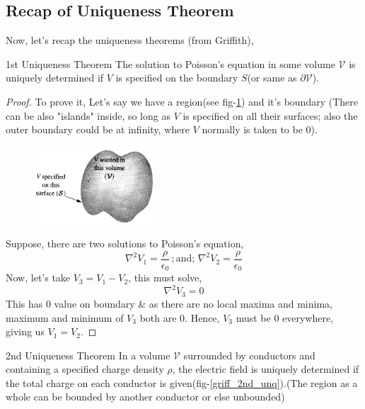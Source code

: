 \documentclass{article}
\begin{document}
\subsection{Recap of Uniqueness Theorem}
Now, let's recap the uniqueness theorems (from Griffith),
\begin{theorem}{1st Uniqueness Theorem}{}
    The solution to Poisson's equation in some volume $\mathcal{V}$ is uniquely determined if $V$ is specified on the boundary $S$(or same as $\partial \mathcal{V}$). 
\end{theorem}
\begin{proof}
    To prove it, Let's say we have a region(see fig-\ref{griff_1st_unq}) and it's boundary (There can be also "islands" inside, so long as $V$ is specified on all their surfaces; also the outer boundary could be at infinity, where $V$ normally is taken to be $0$).
        \begin{figure}[H]
        \centering
        \includegraphics[width=0.4\textwidth]{Images/griff_1st_unq.png}
        \caption{}
        \label{griff_1st_unq}
        \end{figure}
    Suppose, there are two solutions to Poisson's equation,
    $$
    \nabla^2 V_1 = \frac{\rho}{\epsilon_0} \, ;\text{and}; \, \nabla^2V_2 = \frac{\rho}{\epsilon_0}
    $$
    Now, let's take $V_3 = V_1 - V_2$, this must solve,
    $$
    \nabla^2 V_3 = 0
    $$
    This has $0$ value on boundary \& as there are no local maxima and minima, maximum and minimum of $V_3$ both are $0$. Hence, $V_3$ must be $0$ everywhere, giving us $V_1=V_2$.
\end{proof}
\begin{theorem}{2nd Uniqueness Theorem}{}
    In a volume $\mathcal{V}$ surrounded by conductors and containing a specified charge density $\rho$, the electric field is uniquely determined if the total charge on each conductor is given(fig-\ref{griff_2nd_unq}).(The region as a whole can be bounded by another conductor or else unbounded)
\end{theorem}
\end{document}
